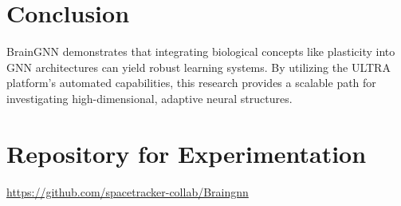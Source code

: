 \documentclass[12pt]{article}
\begin{document}
\section{Conclusion}
BrainGNN demonstrates that integrating biological concepts like plasticity into GNN architectures can yield robust learning systems. By utilizing the ULTRA platform's automated capabilities, this research provides a scalable path for investigating high-dimensional, adaptive neural structures.

\section{Repository for Experimentation}
\noindent
\url{https://github.com/spacetracker-collab/Braingnn}
\end{document}
